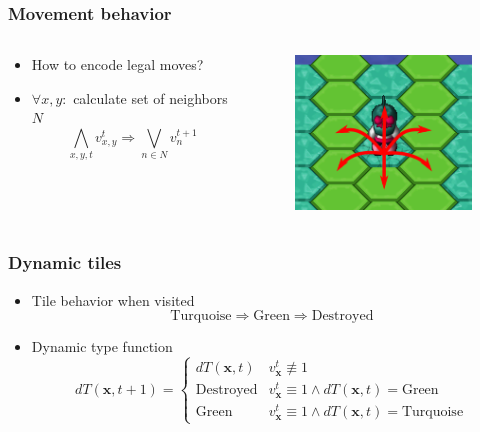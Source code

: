 \begin{frame}
	\frametitle{Movement behavior}
	\begin{columns}
		\begin{column}{6cm}
			\begin{itemize}
				\item How to encode legal moves?
				\item<2-> $\forall x,y:$ calculate set of neighbors $N$
				\begin{displaymath}
					\bigwedge_{x,y,t} v_{x,y}^t \Rightarrow \bigvee_{n\in N} v_{n}^{t+1}
				\end{displaymath}
			\end{itemize}
		\end{column}
		\begin{column}{5cm}
			\begin{figure}
				\centering
				\includegraphics[width=5cm]{images/movement.png}
			\end{figure}
		\end{column}
	\end{columns}
\end{frame}

\begin{frame}
	\frametitle{Dynamic tiles}
	\begin{itemize}
		\item Tile behavior when visited
		\begin{displaymath}
			\text{Turquoise} \Rightarrow \text{Green} \Rightarrow \text{Destroyed}
		\end{displaymath}
		\item Dynamic type function
		\begin{displaymath}
			dT(\pmb x,t+1)=
			\begin{cases}
				dT(\pmb x, t) & v_{\pmb x}^{t} \not \equiv 1\\
				\text{Destroyed} & v_{\pmb x}^{t} \equiv 1 \wedge dT(\pmb x,t) = \text{Green}\\
				\text{Green} & v_{\pmb x}^{t} \equiv 1 \wedge dT(\pmb x,t)=\text{Turquoise}
			\end{cases}
		\end{displaymath}
	\end{itemize}
\end{frame}

